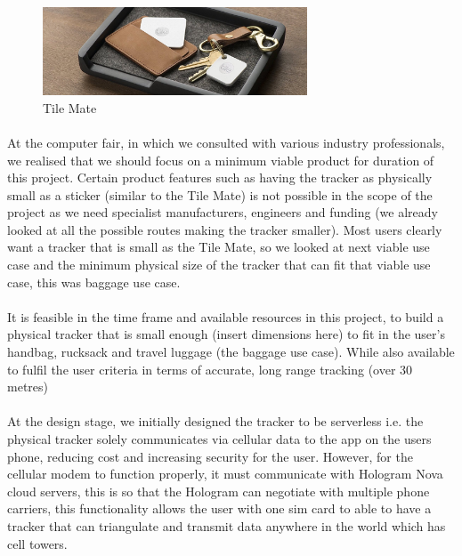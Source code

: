 \documentclass[12pt,a4paper]{article}
\begin{document}
        \begin{figure}[H]
          \centering
          \includegraphics[width=0.7\textwidth]{../assets/design-concept-tile-mate.jpg}
          \caption{Tile Mate}
          \label{fig:Tile Mate}
        \end{figure}
        
        \paragraph{} At the computer fair, in which we consulted with various industry professionals, we realised that we should focus on a minimum viable product for duration of this project. Certain product features such as having the tracker as physically small as a sticker (similar to the Tile Mate) is not possible in the scope of the project as we need specialist manufacturers, engineers and funding (we already looked at all the possible routes making the tracker smaller). Most users clearly want a tracker that is small as the Tile Mate, so we looked at next viable use case and the minimum physical size of the tracker that can fit that viable use case, this was baggage use case.
        
        \paragraph{} It is feasible in the time frame and available resources in this project, to build a physical tracker that is small enough (insert dimensions here) to fit in the user’s handbag, rucksack and travel luggage (the baggage use case). While also available to fulfil the user criteria in terms of accurate, long range tracking (over 30 metres)
        
        \paragraph{} At the design stage, we initially designed the tracker to be serverless i.e. the physical tracker solely communicates via cellular data to the app on the users phone, reducing cost and increasing security for the user. However, for the cellular modem to function properly, it must communicate with Hologram Nova cloud servers, this is so that the Hologram can negotiate with multiple phone carriers, this functionality allows the user with one sim card to able to have a tracker that can triangulate and transmit data anywhere in the world which has cell towers.
        
\end{document}
